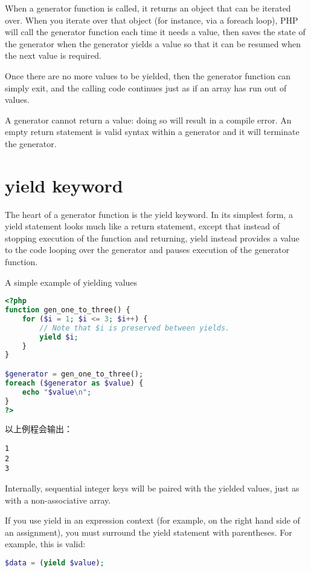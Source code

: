 When a generator function is called, it returns an object that can be iterated over. When you iterate over that object (for instance, via a foreach loop), PHP will call the generator function each time it needs a value, then saves the state of the generator when the generator yields a value so that it can be resumed when the next value is required.

Once there are no more values to be yielded, then the generator function can simply exit, and the calling code continues just as if an array has run out of values.

A generator cannot return a value: doing so will result in a compile error. An empty return statement is valid syntax within a generator and it will terminate the generator.


\section{yield keyword}


The heart of a generator function is the yield keyword. In its simplest form, a yield statement looks much like a return statement, except that instead of stopping execution of the function and returning, yield instead provides a value to the code looping over the generator and pauses execution of the generator function.


\begin{example}
A simple example of yielding values
\begin{lstlisting}[language=PHP]
<?php
function gen_one_to_three() {
    for ($i = 1; $i <= 3; $i++) {
        // Note that $i is preserved between yields.
        yield $i;
    }
}

$generator = gen_one_to_three();
foreach ($generator as $value) {
    echo "$value\n";
}
?>
\end{lstlisting}
\end{example}


以上例程会输出：

\begin{verbatim}
1
2
3
\end{verbatim}

Internally, sequential integer keys will be paired with the yielded values, just as with a non-associative array.

If you use yield in an expression context (for example, on the right hand side of an assignment), you must surround the yield statement with parentheses. For example, this is valid:

\begin{lstlisting}[language=PHP]
$data = (yield $value);
\end{lstlisting}

